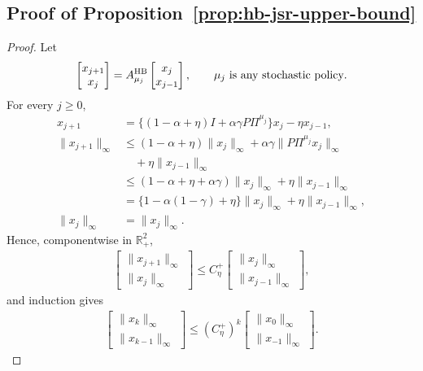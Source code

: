 \documentclass[letterpaper]{article}
\numberwithin{equation}{section}
\newcommand{\R}{\mathbb{R}}
\begin{document}
\subsection{Proof of Proposition~\ref{prop:hb-jsr-upper-bound}}
\label{app:proof-prop-hb-jsr-upper-bound}

\begin{proof}
Let
\begin{align*}
  \begin{bmatrix}x_{j+1}\\x_j\end{bmatrix}
  =A_{\mu_j}^{\rm HB}\begin{bmatrix}x_j\\x_{j-1}\end{bmatrix},
  \qquad
  \mu_j\text{ is any stochastic policy}.
\end{align*}
For every $j\ge0$,
\begin{align*}
x_{j+1}
  &=\{(1-\alpha+\eta)I+\alpha\gamma P\Pi^{\mu_j}\}x_j
    -\eta x_{j-1},\\
\|x_{j+1}\|_\infty
  &\le(1-\alpha+\eta)\|x_j\|_\infty
     +\alpha\gamma\|P\Pi^{\mu_j}x_j\|_\infty\\
  &\quad+
     \eta\|x_{j-1}\|_\infty\\
  &\le(1-\alpha+\eta+\alpha\gamma)\|x_j\|_\infty
     +\eta\|x_{j-1}\|_\infty\\
  &=\{1-\alpha(1-\gamma)+\eta\}\|x_j\|_\infty
     +\eta\|x_{j-1}\|_\infty,\\
\|x_j\|_\infty&=\|x_j\|_\infty.
\end{align*}
Hence, componentwise in $\R^2_+$,
\begin{align*}
  \begin{bmatrix}\|x_{j+1}\|_\infty\\\|x_j\|_\infty\end{bmatrix}
  \le
  C_\eta^+
  \begin{bmatrix}\|x_j\|_\infty\\\|x_{j-1}\|_\infty\end{bmatrix},
\end{align*}
and induction gives
\begin{align*}
  \begin{bmatrix}\|x_k\|_\infty\\\|x_{k-1}\|_\infty\end{bmatrix}
  \le
  (C_\eta^+)^k
  \begin{bmatrix}\|x_0\|_\infty\\\|x_{-1}\|_\infty\end{bmatrix}.

\end{align*}
\end{proof}
\end{document}
